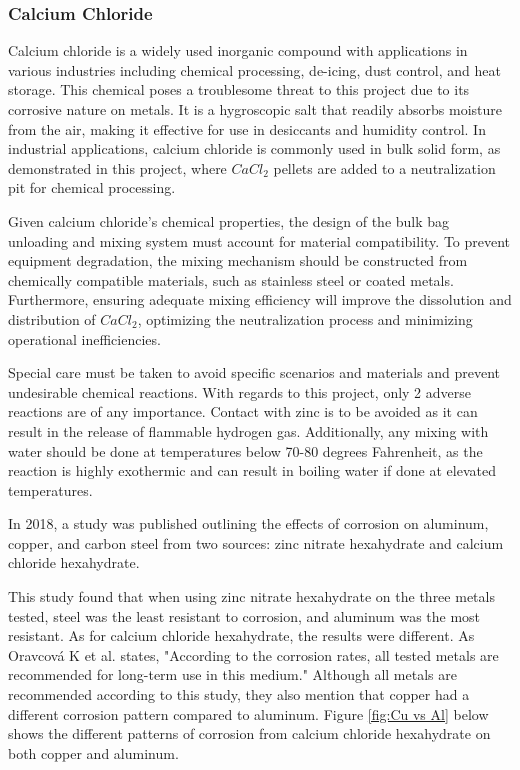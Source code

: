 \documentclass[10pt]{project}
\begin{document}
\subsubsection{Calcium Chloride} \label{sec:CaCl} %

Calcium chloride is a widely used inorganic compound with applications in various industries including chemical processing, de-icing, dust control, and heat storage. This chemical poses a troublesome threat to this project due to its corrosive nature on metals. It is a hygroscopic salt that readily absorbs moisture from the air, making it effective for use in desiccants and humidity control. In industrial applications, calcium chloride is commonly used in bulk solid form, as demonstrated in this project, where $CaCl_2$ pellets are added to a neutralization pit for chemical processing.

Given calcium chloride's chemical properties, the design of the bulk bag unloading and mixing system must account for material compatibility. To prevent equipment degradation, the mixing mechanism should be constructed from chemically compatible materials, such as stainless steel or coated metals. Furthermore, ensuring adequate mixing efficiency will improve the dissolution and distribution of $CaCl_2$, optimizing the neutralization process and minimizing operational inefficiencies.

Special care must be taken to avoid specific scenarios and materials and prevent undesirable chemical reactions.  With regards to this project, only 2 adverse reactions are of any importance.  Contact with zinc is to be avoided as it can result in the release of flammable hydrogen gas.  Additionally, any mixing with water should be done at temperatures below 70-80 degrees Fahrenheit, as the reaction is highly exothermic and can result in boiling water if done at elevated temperatures.

In 2018, a study was published outlining the effects of corrosion on aluminum, copper, and carbon steel from two sources: zinc nitrate hexahydrate and calcium chloride hexahydrate. \cite{Oravcová}

This study found that when using zinc nitrate hexahydrate on the three metals tested, steel was the least resistant to corrosion, and aluminum was the most resistant. As for calcium chloride hexahydrate, the results were different. As Oravcová K et al. states, "According to the corrosion rates, all tested metals are recommended for long-term use in this medium."\cite{Oravcová}
Although all metals are recommended according to this study, they also mention that copper had a different corrosion pattern compared to aluminum. 
Figure \ref{fig:Cu vs Al} below shows the different patterns of corrosion from calcium chloride hexahydrate on both copper and aluminum.
\end{document}
